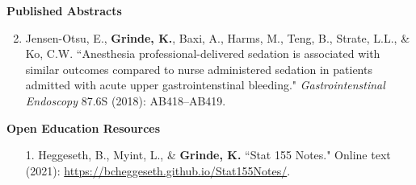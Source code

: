 \documentclass[margin]{res}
\newenvironment{benumerate}[1]{
    \let\oldItem\item
    \def\item{\addtocounter{enumi}{-2}\oldItem}
    
    \begin{enumerate}
    \setcounter{enumi}{#1}
    \addtocounter{enumi}{1}
}{
    \end{enumerate}
}
\begin{document}
\begin{resume}
\textbf{Published Abstracts}
\begin{benumerate}{1}
\item Jensen-Otsu, E., \textbf{Grinde, K.}, Baxi, A., Harms, M., Teng, B., Strate, L.L., \& Ko, C.W. 
``Anesthesia professional-delivered sedation is associated with similar outcomes compared to nurse administered sedation in patients admitted with acute upper gastrointenstinal bleeding." \textit{Gastrointenstinal Endoscopy} 87.6S (2018):  AB418--AB419. %

\end{benumerate}



\textbf{Open Education Resources}

\begin{itemize}

\item[1.] Heggeseth, B., Myint, L., \& \textbf{Grinde, K.} ``Stat 155 Notes." Online text (2021): \href{https://bcheggeseth.github.io/Stat155Notes/}{https://bcheggeseth.github.io/Stat155Notes/}. \\


\end{itemize}
\end{resume}
\end{document}
